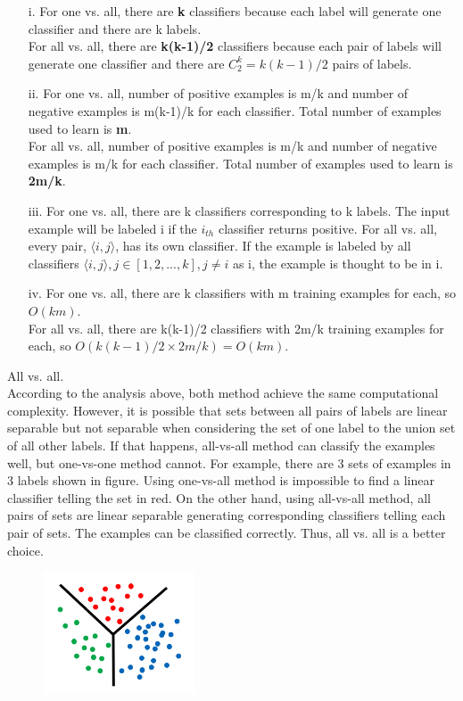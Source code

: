 \item[(a)]
	\begin{itemize}  
	\item[i.]	
	For one vs. all, there are \textbf{k} classifiers because each label will generate one classifier and there are k labels.\\
	For all vs. all, there are \textbf{k(k-1)/2} classifiers because each pair of labels will generate one classifier and there are $C^k_2=k(k-1)/2$ pairs of labels. 
	\item[ii.]
	For one vs. all, number of positive examples is m/k and number of negative examples is m(k-1)/k for each classifier. Total number of examples used to learn is \textbf{m}.\\
	For all vs. all, number of positive examples is m/k and number of negative examples is m/k for each classifier.
	Total number of examples used to learn is \textbf{2m/k}. 
	\item[iii.]
	For one vs. all, there are k classifiers corresponding to k labels. The input example will be labeled i if the $i_{th}$ classifier returns positive.
	For all vs. all, every pair, $\langle i, j \rangle$, has its own classifier. If the example is labeled by all classifiers $\langle i, j \rangle, j\in [1,2,...,k], j\not= i$ as i, the example is thought to be in i.
	\item[iv.]
	For one vs. all, there are k classifiers with m training examples for each, so $O(km)$.\\
	For all vs. all, there are k(k-1)/2 classifiers with 2m/k training examples for each, so $O(k(k-1)/2\times 2m/k)=O(km)$.
	\end{itemize}
\item[(b)]
All vs. all.\\
According to the analysis above, both method achieve the same computational complexity. However, it is possible that sets between all pairs of labels are linear separable but not separable when considering the set of one label to the union set of all other labels. If that happens, all-vs-all method can classify the examples well, but one-vs-one method cannot. For example, there are 3 sets of examples in 3 labels shown in figure. Using one-vs-all method is impossible to find a linear classifier telling the set in red. On the other hand, using all-vs-all method, all pairs of sets are linear separable generating corresponding classifiers telling each pair of sets. The examples can be classified correctly. Thus, all vs. all is a better choice.\\
\begin{figure}[h]
		\centering
	\includegraphics[width=0.4\textwidth]{fig3.png}
\end{figure}\\\\


